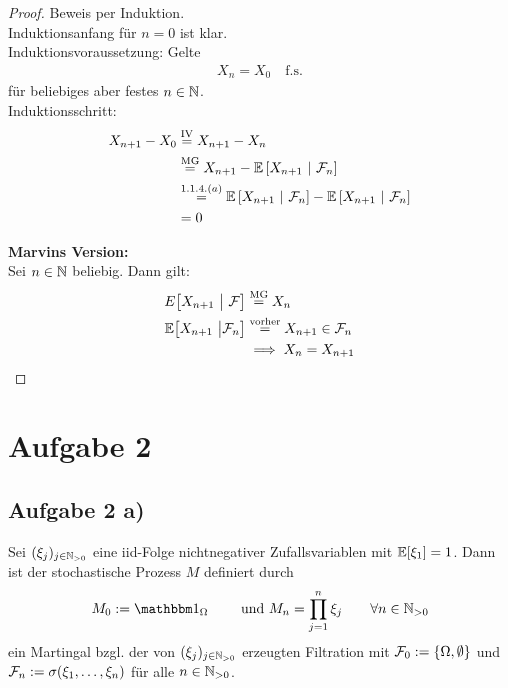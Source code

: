 \documentclass[12pt,a4paper]{article}
\begin{document}
\begin{proof}
	Beweis per Induktion.\\
	Induktionsanfang für $n=0$ ist klar.\\
	Induktionsvoraussetzung: Gelte
	\begin{align*}
		X_n = X_0 \quad \text{f.s.}
	\end{align*}
	für beliebiges aber festes $n\in\mathbb{N}$.\\
	Induktionsschritt:
	\begin{align*}
		X_{n+1}-X_0
		&\stackrel{\text{IV}}{=} X_{n+1} - X_{n} \\
		&\stackrel{\text{MG}}{=} X_{n+1} - \mathbb{E}\left[{X_{n+1}}~|~{\mathcal{F}_{n}}\right] \\
		&\stackrel{1.1.4.(a)}{=} \mathbb{E}\left[{X_{n+1}}~|~{\mathcal{F}_{n}}\right] - \mathbb{E}\left[{X_{n+1}}~|~{\mathcal{F}_{n}}\right] \\
		&= 0
	\end{align*}
	
	\textbf{Marvins Version:}\\
	Sei $n\in\mathbb{N}$ beliebig. Dann gilt:
	\begin{align*}
	E\big[ X_{n+1}~\big|~\mathcal{F}\big]&\stackrel{\text{MG}}{=}X_n\\
	\mathbb{E}\big[X_{n+1}~\big|\mathcal{F}_n\big]&\stackrel{\text{vorher}}{=} X_{n+1}\in\mathcal{F}_n\\
	&\implies X_n=X_{n+1}
	\end{align*}
\end{proof}

\section*{Aufgabe 2}
\subsection*{Aufgabe 2 a)}
Sei $(\xi_j)_{j\in\mathbb{N}_{>0}}$ eine iid-Folge nichtnegativer Zufallsvariablen mit $\mathbb{E}[\xi_1]=1$. Dann ist der stochastische Prozess $M$ definiert durch
\begin{align*}
M_0:=\indi_\Omega\qquad\text{ und }M_n=\prod\limits_{j=1}^n\xi_j\qquad\forall n\in\N_{>0}
\end{align*}
ein Martingal bzgl. der von $(\xi_j)_{j\in\mathbb{N}_{>0}}$ erzeugten Filtration  mit $\mathcal{F}_0:=\lbrace \Omega,\emptyset\rbrace$ und $\mathcal{F}_n:=\sigma(\xi_1,\ldots,\xi_n)$ für alle $n\in\mathbb{N}_{>0}$.
\end{document}
